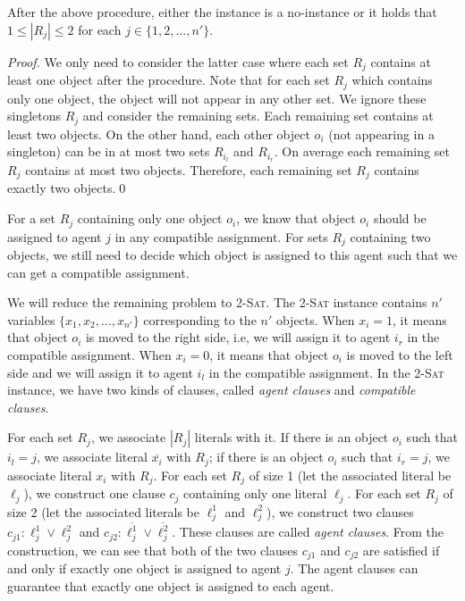 \begin{lemma}\label{lem_exact2}
    After the above procedure, either the instance is a no-instance or it holds that $1\leq|R_j|\leq 2$ for each $j\in\{1,2,\dots, n'\}$.
\end{lemma}
\begin{proof}
    We only need to consider the latter case where each set $R_j$ contains at least one object after the procedure.
    Note that for each set $R_{j}$ which contains only one object, the object will not appear in any other set.
    We ignore these singletons $R_{j}$ and consider the remaining sets.
    Each remaining set contains at least two objects. On the other hand, each other object $o_i$ (not appearing in a singleton) can be in at most two sets $R_{i_l}$ and $R_{i_r}$. On average each remaining set $R_{j}$ contains at most two objects.
    Therefore, each remaining set $R_{j}$ contains exactly two objects.\qed
\end{proof}

For a set $R_{j}$ containing only one object $o_i$, we know that object $o_i$ should be assigned to agent $j$ in any compatible
assignment. For sets $R_{j}$ containing two objects, we still need to decide which object is assigned to this agent such that we can get a compatible assignment.

We will reduce the remaining problem to \textsc{2-Sat}.
The \textsc{2-Sat} instance contains $n'$ variables $\{x_1, x_2, \dots, x_{n'}\}$ corresponding to the $n'$ objects.
When $x_i=1$, it means that object $o_i$ is moved to the right side, i.e, we will assign it to agent $i_r$ in the compatible assignment. When $x_i=0$, it means that object $o_i$ is moved to the left side and we will assign it to agent $i_l$ in the compatible assignment. In the \textsc{2-Sat} instance, we have two kinds of clauses, called \emph{agent clauses} and \emph{compatible clauses}.

For each set $R_{j}$, we associate $|R_{j}|$ literals with it. If there is an object $o_i$ such that $i_l=j$, we associate literal
$\overline{x_i}$ with $R_{j}$;  if there is an object $o_i$ such that $i_r=j$, we associate literal $x_i$ with $R_{j}$.
For each set $R_{j}$ of size 1 (let the associated literal be $\ell_j$), we construct one clause $c_j$ containing only one literal $\ell_j$.
For each set $R_{j}$ of size 2 (let the associated literals be $\ell_j^1$ and $\ell_j^2$), we construct two clauses $c_{j1}:\ell_j^1 \vee \ell_j^2$ and $c_{j2}:\overline{\ell_j^1} \vee \overline{\ell_j^2}$. These clauses are called \emph{agent clauses}.
From the construction, we can see that both of the two clauses $c_{j1}$ and $c_{j2}$ are satisfied if and only if exactly one object is assigned to agent $j$.
The agent clauses can guarantee that exactly one object is assigned to each agent.

